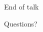 \documentclass[10pt]{beamer}
\begin{document}
% 
% 
% 
% 

\begin{frame}{End of talk}
  \begin{centering}
    Questions?
  \end{centering}
\end{frame}
\end{document}
